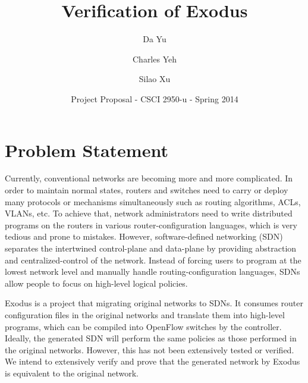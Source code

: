 \documentclass[11pt]{article}
\begin{document}
\title{Verification of Exodus}
\author{Da Yu \and Charles Yeh \and Silao Xu}
\date{Project Proposal - CSCI 2950-u - Spring 2014}
\maketitle


\section{Problem Statement}
\par Currently, conventional networks are becoming more and more complicated. In order to maintain normal states, routers and switches need to carry or deploy many protocols or mechanisms simultaneously such as routing algorithms, ACLs, VLANs, etc. To achieve that, network administrators need to write distributed programs on the routers in various router-configuration languages, which is very tedious and prone to mistakes. However, software-defined networking (SDN) separates the intertwined control-plane and data-plane by providing abstraction and centralized-control of the network. Instead of forcing users to program at the lowest network level and manually handle routing-configuration languages, SDNs allow people to focus on high-level logical policies.
\par Exodus is a project that migrating original networks to SDNs. It consumes router configuration files in the original networks and translate them into high-level programs, which can be compiled into OpenFlow switches by the controller. Ideally, the generated SDN will perform the same policies as those performed in the original networks. However, this has not been extensively tested or verified. We intend to extensively verify and prove that the generated network by Exodus is equivalent to the original network.
\end{document}
